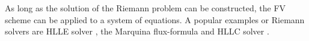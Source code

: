 %
%
As long as the solution of the Riemann problem can be constructed, the \ac{FV} scheme can be applied to a system of equations. 
A popular examples or Riemann solvers are \ac{HLLE} solver \citep{Roe:1981}, the Marquina flux-formula \citep{Donat:1996} and \ac{HLLC} solver \citep{Einfeldt:1988}.

